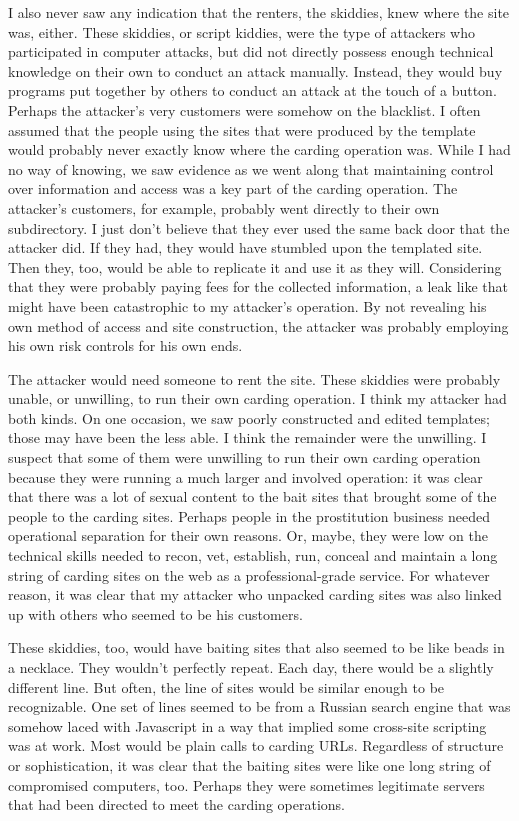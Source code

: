I also never saw any indication that the renters, the skiddies, knew where the site was, either.  These skiddies, or script kiddies, were the type of attackers who participated in computer attacks, but did not directly possess enough technical knowledge on their own to conduct an \gls{attack} manually.  Instead, they would buy programs put together by others to conduct an \gls{attack} at the touch of a button.  Perhaps the attacker's very customers were somehow on the blacklist.  I often assumed that the people using the sites that were produced by the template would probably never exactly know where the carding operation was.  While I had no way of knowing, we saw evidence as we went along that maintaining control over information and access was a key part of the carding operation.  The attacker's customers, for example, probably went directly to their own subdirectory.  I just don't believe that they ever used the same back door that the attacker did.  If they had, they would have stumbled upon the templated site.  Then they, too, would be able to replicate it and use it as they will.  Considering that they were probably paying fees for the collected information, a leak like that might have been catastrophic to my attacker's operation.  By not revealing his own method of access and site construction, the attacker was probably employing his own risk controls for his own ends.

The attacker would need someone to rent the site.  These skiddies were probably unable, or unwilling, to run their own carding operation.  I think my attacker had both kinds.  On one occasion, we saw poorly constructed and edited templates; those may have been the less able.  I think the remainder were the unwilling.  I suspect that some of them were unwilling to run their own carding operation because they were running a much larger and involved operation:  it was clear that there was a lot of sexual content to the bait sites that brought some of the people to the carding sites.  Perhaps people in the prostitution business needed operational separation for their own reasons.  Or, maybe, they were low on the technical skills needed to recon, vet, establish, run, conceal and maintain a long string of carding sites on the web as a professional-grade service.  For whatever reason, it was clear that my attacker who unpacked carding sites was also linked up with others who seemed to be his customers.

These skiddies, too, would have baiting sites that also seemed to be like beads in a necklace.  They wouldn't perfectly repeat.  Each day, there would be a slightly different line.  But often, the line of sites would be similar enough to be recognizable.  One set of lines seemed to be from a Russian search engine that was somehow laced with Javascript in a way that implied some cross-site scripting was at work.  Most would be plain calls to carding URLs.  Regardless of structure or sophistication, it was clear that the baiting sites were like one long string of compromised computers, too.  Perhaps they were sometimes legitimate servers that had been directed to meet the carding operations.

